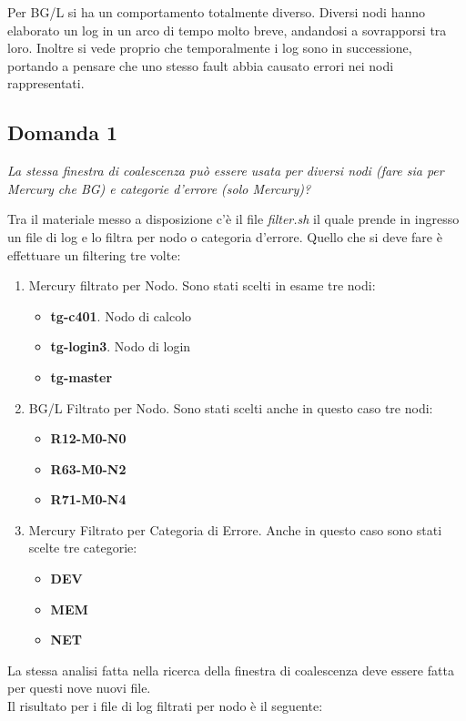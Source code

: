 Per BG/L si ha un comportamento totalmente diverso. Diversi nodi hanno elaborato un log in un arco di tempo molto breve, andandosi a sovrapporsi tra loro. Inoltre si vede proprio che temporalmente i log sono in successione, portando a pensare che uno stesso fault abbia causato errori nei nodi rappresentati.

\subsection{Domanda 1}
\begin{center}
	\textit{La stessa finestra di coalescenza può essere usata per diversi nodi (fare sia per Mercury che BG) e categorie d'errore (solo Mercury)?} 
\end{center}
Tra il materiale messo a disposizione c'è il file \textit{filter.sh} il quale prende in ingresso un file di log e lo filtra per nodo o categoria d'errore. Quello che si deve fare è effettuare un filtering tre volte:
\begin{enumerate}
	\item Mercury filtrato per Nodo. Sono stati scelti in esame tre nodi:
	\begin{itemize}
		\item \textbf{tg-c401}. Nodo di calcolo
		\item \textbf{tg-login3}. Nodo di login
		\item \textbf{tg-master}
	\end{itemize}
	\item BG/L Filtrato per Nodo. Sono stati scelti anche in questo caso tre nodi:
	\begin{itemize}
		\item \textbf{R12-M0-N0}
		\item \textbf{R63-M0-N2}
		\item \textbf{R71-M0-N4}
	\end{itemize}
	\item Mercury Filtrato per Categoria di Errore. Anche in questo caso sono stati scelte tre categorie:
	\begin{itemize}
		\item \textbf{DEV}
		\item \textbf{MEM}
		\item \textbf{NET}		
	\end{itemize} 
\end{enumerate}
La stessa analisi fatta nella ricerca della finestra di coalescenza deve essere fatta per questi nove nuovi file. 
\\Il risultato per i file di log filtrati per nodo è il seguente:
